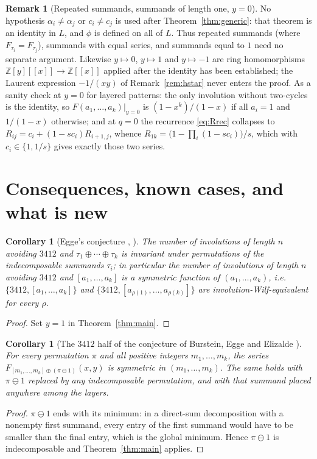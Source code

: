 \documentclass[11pt]{amsart}
\newtheorem{corollary}[theorem]{Corollary}
\theoremstyle{definition}
\newtheorem{remark}[theorem]{Remark}
\newcommand{\Z}{\mathbb{Z}}
\newcommand{\ds}{\oplus}
\newcommand{\sk}{\ominus}
\begin{document}
\begin{remark}[Repeated summands, summands of length one, $y=0$]\label{rem:repeated}
No hypothesis $\alpha_i\ne\alpha_j$ or $c_i\ne c_j$ is used after Theorem~\ref{thm:generic}: that theorem is an identity in $L$, and $\phi$ is defined on all of $L$. Thus repeated summands (where $F_{\tau_i}=F_{\tau_j}$), summands with equal series, and summands equal to $1$ need no separate argument. Likewise $y\mapsto0$, $y\mapsto1$ and $y\mapsto-1$ are ring homomorphisms $\Z[y][[x]]\to\Z[[x]]$ applied after the identity has been established; the Laurent expression $-1/(xy)$ of Remark~\ref{rem:hstar} never enters the proof. As a sanity check at $y=0$ for layered patterns: the only involution without two-cycles is the identity, so $F(a_1,\dots,a_k)|_{y=0}$ is $(1-x^k)/(1-x)$ if all $a_i=1$ and $1/(1-x)$ otherwise; and at $q=0$ the recurrence \eqref{eq:Rrec} collapses to $R_{ij}=c_i+(1-sc_i)R_{i+1,j}$, whence $R_{1k}=\bigl(1-\prod_i(1-sc_i)\bigr)/s$, which with $c_i\in\{1,1/s\}$ gives exactly those two series.
\end{remark}

\section{Consequences, known cases, and what is new}\label{sec:cor}

\begin{corollary}[Egge's conjecture {\cite[Conjecture 6.9]{Egge2004}}, {\cite[Conjecture 3.8]{Egge2007}}]\label{cor:ordinary}
The number of involutions of length $n$ avoiding $3412$ and $\tau_1\ds\cdots\ds\tau_k$ is invariant under permutations of the indecomposable summands $\tau_i$; in particular the number of involutions of length $n$ avoiding $3412$ and $[a_1,\dots,a_k]$ is a symmetric function of $(a_1,\dots,a_k)$, i.e.\ $\{3412,[a_1,\dots,a_k]\}$ and $\{3412,[a_{\rho(1)},\dots,a_{\rho(k)}]\}$ are involution-Wilf-equivalent for every $\rho$.
\end{corollary}
\begin{proof}
Set $y=1$ in Theorem~\ref{thm:main}.
\end{proof}

\begin{corollary}[The $3412$ half of the conjecture of Burstein, Egge and Elizalde \cite{BursteinPP2026}]\label{cor:BEE}
For every permutation $\pi$ and all positive integers $m_1,\dots,m_k$, the series $F_{[m_1,\dots,m_k]\ds(\pi\sk1)}(x,y)$ is symmetric in $(m_1,\dots,m_k)$. The same holds with $\pi\sk1$ replaced by any indecomposable permutation, and with that summand placed anywhere among the layers.
\end{corollary}
\begin{proof}
$\pi\sk1$ ends with its minimum: in a direct-sum decomposition with a nonempty first summand, every entry of the first summand would have to be smaller than the final entry, which is the global minimum. Hence $\pi\sk1$ is indecomposable and Theorem~\ref{thm:main} applies.
\end{proof}
\end{document}
